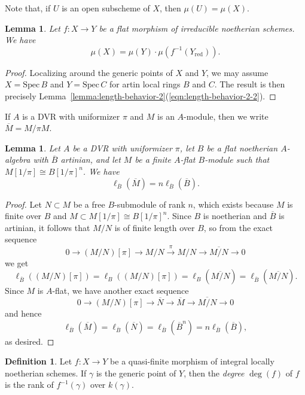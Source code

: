 \documentclass[11pt,reqno]{amsart}
\newtheorem{lemma}[theorem]{Lemma}
\theoremstyle{definition}
\newtheorem{definition}[theorem]{Definition}
\renewcommand{\rm}{\mathrm}
\newcommand{\Spec}{\mathrm{Spec} \,}
\newcommand{\ov}[1]{\overline{#1}}
\begin{document}
Note that, if $U$ is an open subscheme of $X$, then $\mu(U) = \mu(X)$. 

\begin{lemma}\label{lemma:mult-flat-cover}
    Let $f\colon X \to Y$ be a flat morphism of irreducible noetherian schemes. We have
    \[
    \mu(X) = \mu(Y) \cdot \mu(f^{-1}(Y_{\rm{red}})).
    \]
\end{lemma}

\begin{proof}
    Localizing around the generic points of $X$ and $Y$, we may assume $X = \Spec B$ and $Y = \Spec C$ for artin local rings $B$ and $C$. The result is then precisely Lemma~\ref{lemma:length-behavior-2}(\ref{eqn:length-behavior-2-2}).
\end{proof}

If $A$ is a DVR with uniformizer $\pi$ and $M$ is an $A$-module, then we write $\ov{M} = M/\pi M$.

\begin{lemma}\label{lemma:length-behavior-1}
    Let $A$ be a DVR with uniformizer $\pi$, let $B$ be a flat noetherian $A$-algebra with $\ov{B}$ artinian, and let $M$ be a finite $A$-flat $B$-module such that $M[1/\pi] \cong B[1/\pi]^n$. We have
    \[
    \ell_{\ov{B}}(\ov{M}) = n\ell_{\ov{B}}(\ov{B}).
    \]
\end{lemma}

\begin{proof}
    Let $N \subset M$ be a free $B$-submodule of rank $n$, which exists because $M$ is finite over $B$ and $M \subset M[1/\pi] \cong B[1/\pi]^n$. Since $B$ is noetherian and $\ov{B}$ is artinian, it follows that $M/N$ is of finite length over $B$, so from the exact sequence
    \[
    0 \to (M/N)[\pi] \to M/N \xrightarrow{\pi} M/N \to \ov{M/N} \to 0
    \]
    we get
    \[
    \ell_{\ov{B}}((M/N)[\pi]) = \ell_B((M/N)[\pi]) = \ell_B(\ov{M/N}) = \ell_{\ov{B}}(\ov{M/N}).
    \]
    Since $M$ is $A$-flat, we have another exact sequence
    \[
    0 \to (M/N)[\pi] \to \ov{N} \to \ov{M} \to \ov{M/N} \to 0
    \]
    and hence
    \[
    \ell_{\ov{B}}(\ov{M}) = \ell_{\ov{B}}(\ov{N}) = \ell_{\ov{B}}(\ov{B}^n) = n\ell_{\ov{B}}(\ov{B}),
    \]
    as desired.
\end{proof}

\begin{definition}\label{def:deg}
    Let $f\colon X \to Y$ be a quasi-finite morphism of integral locally noetherian schemes. If $\gamma$ is the generic point of $Y$, then the \textit{degree} $\deg(f)$ of $f$ is the rank of $f^{-1}(\gamma)$ over $k(\gamma)$.
\end{definition}
\end{document}
